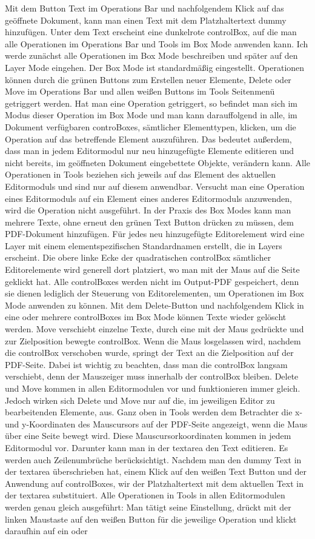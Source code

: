Mit dem Button Text im Operations Bar und nachfolgendem Klick auf das geöffnete Dokument, kann man einen Text mit dem Platzhaltertext dummy hinzufügen. Unter dem Text erscheint eine dunkelrote controlBox, auf die man alle Operationen im Operations Bar und Tools im Box Mode anwenden kann. Ich werde zunächst alle Operationen im Box Mode beschreiben und später auf den Layer Mode eingehen. Der Box Mode ist standardmäßig eingestellt. Operationen können durch die grünen Buttons zum Erstellen neuer Elemente, Delete oder Move im Operations Bar und allen weißen Buttons im Tools Seitenmenü getriggert werden. Hat man eine Operation getriggert, so befindet man sich im Modus dieser Operation im Box Mode und man kann darauffolgend in alle, im Dokument verfügbaren controBoxes, sämtlicher Elementtypen, klicken, um die Operation auf das betreffende Element auszuführen. Das bedeutet außerdem, dass man in jedem Editormodul nur neu hinzugefügte Elemente editieren und nicht bereits, im geöffneten Dokument eingebettete Objekte, verändern kann. Alle Operationen in Tools beziehen sich jeweils auf das Element des aktuellen Editormoduls und sind nur auf diesem anwendbar. Versucht man eine Operation eines Editormoduls auf ein Element eines anderes Editormoduls anzuwenden, wird die Operation nicht ausgeführt. In der Praxis des Box Modes kann man mehrere Texte, ohne erneut den grünen Text Button drücken zu müssen, dem PDF-Dokument hinzufügen. Für jedes neu hinzugefügte Editorelement wird eine Layer mit einem elementspezifischen Standardnamen erstellt, die in Layers erscheint. Die obere linke Ecke der quadratischen controlBox sämtlicher Editorelemente wird generell dort platziert, wo man mit der Maus auf die Seite geklickt hat. Alle controlBoxes werden nicht im  Output-PDF gespeichert, denn sie dienen lediglich der Steuerung von Editorelementen, um Operationen im Box Mode anwenden zu können. Mit dem Delete-Button und nachfolgendem Klick in eine oder mehrere controlBoxes im Box Mode können Texte wieder gelöscht werden. Move verschiebt einzelne Texte, durch eine mit der Maus gedrückte und zur Zielposition bewegte controlBox. Wenn die Maus losgelassen wird, nachdem die controlBox verschoben wurde, springt der Text an die Zielposition auf der PDF-Seite. Dabei ist wichtig zu beachten, dass man die controlBox langsam verschiebt, denn der Mauszeiger muss innerhalb der controlBox bleiben. Delete und Move kommen in allen Editormodulen vor und funktionieren immer gleich. Jedoch wirken sich Delete und Move nur auf die, im jeweiligen Editor zu bearbeitenden Elemente, aus. Ganz oben in Tools werden dem Betrachter die x- und y-Koordinaten des Mauscursors auf der PDF-Seite angezeigt, wenn die Maus über eine Seite bewegt wird. Diese Mauscursorkoordinaten kommen in jedem Editormodul vor. Darunter kann man in der textarea den Text editieren. Es werden auch Zeilenumbrüche berücksichtigt. Nachdem man den dummy Text in der textarea überschrieben hat, einem Klick auf den weißen Text Button und der Anwendung auf controlBoxes, wir der Platzhaltertext mit dem aktuellen Text in der textarea substituiert. Alle Operationen in Tools in allen Editormodulen werden genau gleich ausgeführt: Man tätigt seine Einstellung, drückt mit der linken Maustaste auf den weißen Button für die jeweilige Operation und klickt daraufhin auf ein oder 